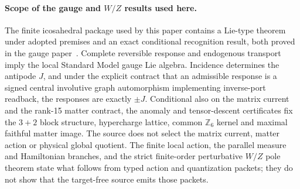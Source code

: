 \paragraph{Scope of the gauge and \(W/Z\) results used here.}
The finite icosahedral package used by this paper contains a Lie-type theorem
under adopted premises and an exact conditional recognition result, both
proved in the gauge paper~\cite{ophGauge}. Complete reversible response and
endogenous transport imply the local Standard Model gauge Lie algebra.
Incidence determines the antipode \(J\), and under the explicit contract that
an admissible response is a signed central involutive graph automorphism
implementing inverse-port readback, the responses are exactly \(\pm J\).
Conditional also on the matrix current and the rank-15 matter contract, the
anomaly and tensor-descent certificates fix the \(3+2\) block structure,
hypercharge lattice, common \(\mathbb Z_6\) kernel and maximal faithful matter
image. The source does not select the matrix current, matter action or
physical global quotient. The finite local action, the parallel measure and
Hamiltonian branches, and the strict finite-order perturbative \(W/Z\) pole
theorem state what follows from typed action and quantization packets; they
do not show that the target-free source emits those packets.

